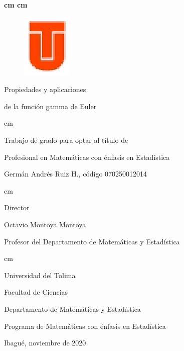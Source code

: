 \thispagestyle{empty}
{\bf
{}
 cm
 cm
\medskip
\begin{figure}[htbp]
\includegraphics[scale=1]{logoutolima.eps}
\end{figure}
\newpage
\thispagestyle{empty}
\centerline{\Large Propiedades y aplicaciones}
\centerline{\Large de la función gamma de Euler}
 cm
\centerline{Trabajo de grado para optar al título de}
\centerline{Profesional en Matemáticas con énfasis en Estadística}
\bigskip
\centerline{\large Germán Andrés Ruiz H., código 070250012014}
 cm
\centerline{\large Director}
\centerline{\large Octavio Montoya Montoya}
\centerline{Profesor del Departamento de Matemáticas y Estadística}
\bigskip
{} cm
\centerline{\large Universidad del Tolima}
\centerline{\large Facultad de Ciencias}
\centerline{\large Departamento de Matemáticas y Estadística}
\centerline{\large Programa de Matemáticas con énfasis en Estadística}
\centerline{\large Ibagué, noviembre de 2020}
}
\newpage
\endinput
